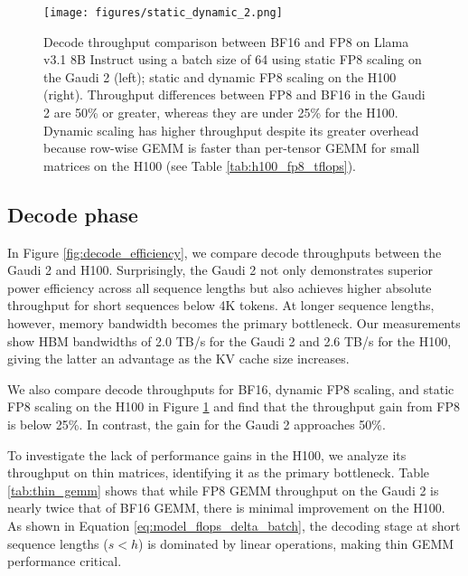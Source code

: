 \begin{figure}[]
    \centering
    \texttt{[image: figures/static\_dynamic\_2.png]}
    \vspace{-1.6em}
    \caption{Decode throughput comparison between BF16 and FP8 on Llama v3.1 8B Instruct using a batch size of 64 using static FP8 scaling on the Gaudi 2 (left); static and dynamic FP8 scaling on the H100 (right). Throughput differences between FP8 and BF16 in the Gaudi 2 are 50\% or greater, whereas they are under 25\% for the H100. Dynamic scaling has higher throughput despite its greater overhead because row-wise GEMM is faster than per-tensor GEMM for small matrices on the H100 (see Table \ref{tab:h100_fp8_tflops}).}
    \label{fig:static_dynamic}
\end{figure}

\subsection{Decode phase}

In Figure \ref{fig:decode_efficiency}, we compare decode throughputs between the Gaudi 2 and H100. Surprisingly, the Gaudi 2 not only demonstrates superior power efficiency across all sequence lengths but also achieves higher absolute throughput for short sequences below 4K tokens. At longer sequence lengths, however, memory bandwidth becomes the primary bottleneck. Our measurements show HBM bandwidths of 2.0 TB/s for the Gaudi 2 and 2.6 TB/s for the H100, giving the latter an advantage as the KV cache size increases.

We also compare decode throughputs for BF16, dynamic FP8 scaling, and static FP8 scaling on the H100 in Figure \ref{fig:static_dynamic} and find that the throughput gain from FP8 is below 25\%. In contrast, the gain for the Gaudi 2 approaches 50\%.






To investigate the lack of performance gains in the H100, we analyze its throughput on thin matrices, identifying it as the primary bottleneck. Table \ref{tab:thin_gemm} shows that while FP8 GEMM throughput on the Gaudi 2 is nearly twice that of BF16 GEMM, there is minimal improvement on the H100. As shown in Equation \ref{eq:model_flops_delta_batch}, the decoding stage at short sequence lengths ($s < h$) is dominated by linear operations, making thin GEMM performance critical.

